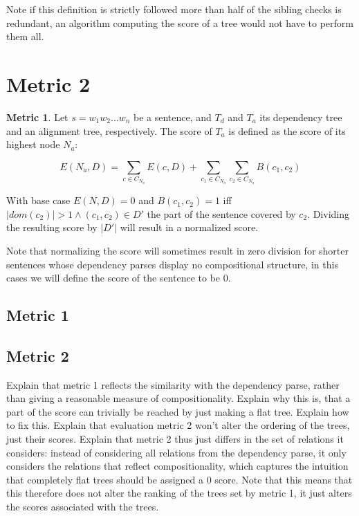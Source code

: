 \documentclass{report}
\theoremstyle{definition}
\newtheorem{metric}{Metric}
\theoremstyle{plain}
\begin{document}
\noindent  Note if this definition is strictly followed more than half of the sibling checks is redundant, an algorithm computing the score of a tree would not have to perform them all.

\section{Metric 2}

\begin{metric}\label{m2}
Let $s = w_1 w_2 \dots w_n$ be a sentence, and $T_d$ and $T_a$ its dependency tree and an alignment tree, respectively. The score of $T_a$ is defined as the score of its highest node $N_{a}$:

$$
E(N_a,D) = \sum_{c\in C_{N_a}} E(c,D)+ \sum_{c_1\in C_{N_a}} \sum_{c_2\in C_{N_a}} B(c_1,c_2)
$$

\noindent With base case $E(N,D) = 0$ and $B(c_1,c_2) = 1$ iff  $|dom(c_2)| > 1 \land (c_1,c_2)\in D'$ the part of the sentence covered by $c_2$. Dividing the resulting score by $|D'|$ will result in a normalized score.
\end{metric}

Note that normalizing the score will sometimes result in zero division for shorter sentences whose dependency parses display no compositional structure, in this cases we will define the score of the sentence to be 0.


\subsection{Metric 1}


\subsection{Metric 2}

Explain that metric 1 reflects the similarity with the dependency parse, rather than giving a reasonable measure of compositionality. Explain why this is, that a part of the score can trivially be reached by just making a flat tree. Explain how to fix this. Explain that evaluation metric 2 won't alter the ordering of the trees, just their scores.
Explain that metric 2 thus just differs in the set of relations it considers: instead of considering all relations from the dependency parse, it only considers the relations that reflect compositionality, which captures the intuition that completely flat trees should be assigned a 0 score. Note that this means that this therefore does not alter the ranking of the trees set by metric 1, it just alters the scores associated with the trees.
\end{document}
